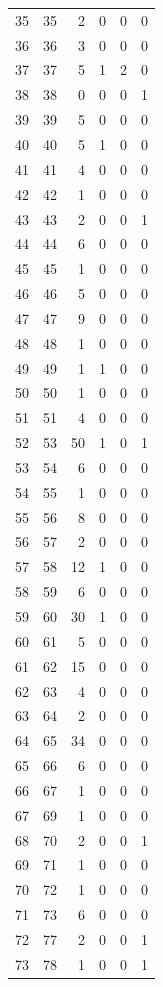 \documentclass[
  letterpaper,
  DIV=11,
  numbers=noendperiod]{scrreprt}
\begin{document}
\begin{longtable}[]{@{}rrrrrr@{}}
35 & 35 & 2 & 0 & 0 & 0 \\
36 & 36 & 3 & 0 & 0 & 0 \\
37 & 37 & 5 & 1 & 2 & 0 \\
38 & 38 & 0 & 0 & 0 & 1 \\
39 & 39 & 5 & 0 & 0 & 0 \\
40 & 40 & 5 & 1 & 0 & 0 \\
41 & 41 & 4 & 0 & 0 & 0 \\
42 & 42 & 1 & 0 & 0 & 0 \\
43 & 43 & 2 & 0 & 0 & 1 \\
44 & 44 & 6 & 0 & 0 & 0 \\
45 & 45 & 1 & 0 & 0 & 0 \\
46 & 46 & 5 & 0 & 0 & 0 \\
47 & 47 & 9 & 0 & 0 & 0 \\
48 & 48 & 1 & 0 & 0 & 0 \\
49 & 49 & 1 & 1 & 0 & 0 \\
50 & 50 & 1 & 0 & 0 & 0 \\
51 & 51 & 4 & 0 & 0 & 0 \\
52 & 53 & 50 & 1 & 0 & 1 \\
53 & 54 & 6 & 0 & 0 & 0 \\
54 & 55 & 1 & 0 & 0 & 0 \\
55 & 56 & 8 & 0 & 0 & 0 \\
56 & 57 & 2 & 0 & 0 & 0 \\
57 & 58 & 12 & 1 & 0 & 0 \\
58 & 59 & 6 & 0 & 0 & 0 \\
59 & 60 & 30 & 1 & 0 & 0 \\
60 & 61 & 5 & 0 & 0 & 0 \\
61 & 62 & 15 & 0 & 0 & 0 \\
62 & 63 & 4 & 0 & 0 & 0 \\
63 & 64 & 2 & 0 & 0 & 0 \\
64 & 65 & 34 & 0 & 0 & 0 \\
65 & 66 & 6 & 0 & 0 & 0 \\
66 & 67 & 1 & 0 & 0 & 0 \\
67 & 69 & 1 & 0 & 0 & 0 \\
68 & 70 & 2 & 0 & 0 & 1 \\
69 & 71 & 1 & 0 & 0 & 0 \\
70 & 72 & 1 & 0 & 0 & 0 \\
71 & 73 & 6 & 0 & 0 & 0 \\
72 & 77 & 2 & 0 & 0 & 1 \\
73 & 78 & 1 & 0 & 0 & 1 \\

\end{longtable}
\end{document}
